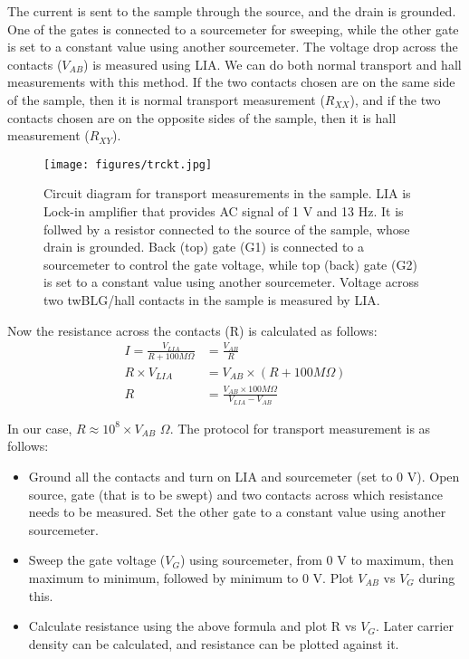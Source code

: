 The current is sent to the sample through the source, and the drain is grounded. One of the gates is connected to a sourcemeter for sweeping, while the other gate is set to a constant value using another sourcemeter. The voltage drop across the contacts ($V_{AB}$) is measured using LIA. We can do both normal transport and hall measurements with this method. If the two contacts chosen are on the same side of the sample, then it is normal transport measurement ($R_{XX}$), and if the two contacts chosen are on the opposite sides of the sample, then it is hall measurement ($R_{XY}$).

\begin{figure}[H]
	\centering
	\texttt{[image: figures/trckt.jpg]}
	\caption{Circuit diagram for transport measurements in the sample. LIA is Lock-in amplifier that provides AC signal of 1 V and 13 Hz. It is follwed by a resistor connected to the source of the sample, whose drain is grounded. Back (top) gate (G1) is connected to a sourcemeter to control the gate voltage, while top (back) gate (G2) is set to a constant value using another sourcemeter. Voltage across two twBLG/hall contacts in the sample is measured by LIA.}
	\label{fig:trckt}
\end{figure}

Now the resistance across the contacts (R) is calculated as follows:
\begin{align*}
	I = \frac{V_{LIA}}{R+ 100 M\Omega} &= \frac{V_{AB}}{R} \\
	R \times V_{LIA} &= V_{AB} \times (R+ 100 M\Omega) \\
	R &= \frac{V_{AB} \times 100 M\Omega}{V_{LIA}-V_{AB}}
\end{align*}

In our case, $R\approx10^8\times V_{AB}$ $\Omega$. The protocol for transport measurement is as follows:

\begin{itemize}
	\item Ground all the contacts and turn on LIA and sourcemeter (set to 0 V). Open source, gate (that is to be swept) and two contacts across which resistance needs to be measured. Set the other gate to a constant value using another sourcemeter.
	\item Sweep the gate voltage ($V_G$) using sourcemeter, from 0 V to maximum, then maximum to minimum, followed by minimum to 0 V. Plot $V_{AB}$ vs $V_G$ during this.
	\item Calculate resistance using the above formula and plot R vs $V_G$. Later carrier density can be calculated, and resistance can be plotted against it.
\end{itemize}

